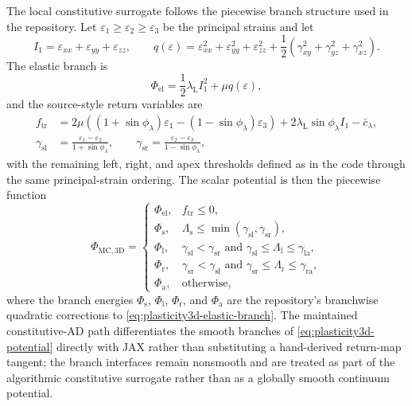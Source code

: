 The local constitutive surrogate follows the piecewise branch structure used in
the repository. Let $\varepsilon_1 \ge \varepsilon_2 \ge \varepsilon_3$ be the
principal strains and let
\begin{equation}
  I_1 = \varepsilon_{xx} + \varepsilon_{yy} + \varepsilon_{zz},
  \qquad
  q(\varepsilon) =
  \varepsilon_{xx}^2 + \varepsilon_{yy}^2 + \varepsilon_{zz}^2
  + \frac{1}{2}\left(
    \gamma_{xy}^2 + \gamma_{yz}^2 + \gamma_{xz}^2
  \right).
  \label{eq:plasticity3d-invariants}
\end{equation}
The elastic branch is
\begin{equation}
  \Phi_{\mathrm{el}}
  = \frac{1}{2}\lambda_{\mathrm{L}} I_1^2 + \mu q(\varepsilon),
  \label{eq:plasticity3d-elastic-branch}
\end{equation}
and the source-style return variables are
\begin{align}
  f_{\mathrm{tr}}
  &=
  2\mu\!\left((1+\sin\phi_{\lambda})\varepsilon_1 -
  (1-\sin\phi_{\lambda})\varepsilon_3\right)
  + 2\lambda_{\mathrm{L}}\sin\phi_{\lambda} I_1
  - \bar c_{\lambda},
  \nonumber\\
  \gamma_{\mathrm{sl}}
  &= \frac{\varepsilon_1-\varepsilon_2}{1+\sin\phi_{\lambda}},
  \qquad
  \gamma_{\mathrm{sr}}
  = \frac{\varepsilon_2-\varepsilon_3}{1-\sin\phi_{\lambda}},
  \label{eq:plasticity3d-return-tests}
\end{align}
with the remaining left, right, and apex thresholds defined as in the code
through the same principal-strain ordering. The scalar potential is then the
piecewise function
\begin{equation}
  \Phi_{\mathrm{MC},3\mathrm{D}}
  =
  \begin{cases}
    \Phi_{\mathrm{el}},
      & f_{\mathrm{tr}} \le 0, \\
    \Phi_{\mathrm{s}},
      & \Lambda_{\mathrm{s}} \le \min(\gamma_{\mathrm{sl}},\gamma_{\mathrm{sr}}), \\
    \Phi_{\mathrm{l}},
      & \gamma_{\mathrm{sl}} < \gamma_{\mathrm{sr}}
        \text{ and }
        \gamma_{\mathrm{sl}} \le \Lambda_{\mathrm{l}} \le \gamma_{\mathrm{la}}, \\
    \Phi_{\mathrm{r}},
      & \gamma_{\mathrm{sr}} < \gamma_{\mathrm{sl}}
        \text{ and }
        \gamma_{\mathrm{sr}} \le \Lambda_{\mathrm{r}} \le \gamma_{\mathrm{ra}}, \\
    \Phi_{\mathrm{a}},
      & \text{otherwise},
  \end{cases}
  \label{eq:plasticity3d-potential}
\end{equation}
where the branch energies $\Phi_{\mathrm{s}}$, $\Phi_{\mathrm{l}}$,
$\Phi_{\mathrm{r}}$, and $\Phi_{\mathrm{a}}$ are the repository's branchwise
quadratic corrections to \cref{eq:plasticity3d-elastic-branch}. The maintained
constitutive-AD path differentiates the smooth branches of
\cref{eq:plasticity3d-potential} directly with JAX rather than substituting a
hand-derived return-map tangent; the branch interfaces remain nonsmooth and are
treated as part of the algorithmic constitutive surrogate rather than as a
globally smooth continuum potential.

